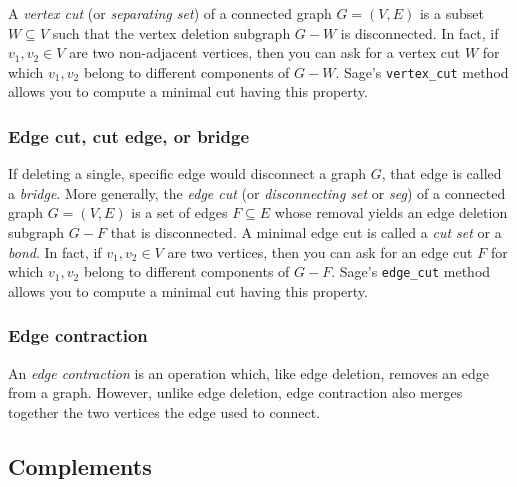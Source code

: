A \emph{vertex cut} (or \emph{separating set}) of a connected graph
$G = (V, E)$ is a subset $W \subseteq V$ such that the vertex deletion
subgraph $G - W$ is disconnected.
In fact, if $v_1, v_2 \in V$ are two non-adjacent vertices, then you
can ask for a vertex cut $W$ for which $v_1, v_2$ belong to different
components of $G - W$. Sage's \verb!vertex_cut! method allows you to
compute a minimal cut having this property.


\subsubsection{Edge cut, cut edge, or bridge}

If deleting a single, specific edge would disconnect a graph $G$, that
edge is called a \emph{bridge}. More generally, the \emph{edge cut}
(or \emph{disconnecting set} or \emph{seg}) of a connected graph
$G = (V, E)$ is a set of edges $F \subseteq E$ whose removal yields an
edge deletion subgraph $G - F$ that is disconnected. A minimal edge
cut is called a \emph{cut set} or a \emph{bond}.
In fact, if $v_1, v_2 \in V$ are two vertices, then you can ask for an
edge cut $F$ for which $v_1, v_2$ belong to different components of
$G - F$. Sage's \verb!edge_cut! method allows you to compute a minimal
cut having this property.


\subsubsection{Edge contraction}

An \emph{edge contraction} is an operation which, like edge deletion,
removes an edge from a graph. However, unlike edge deletion, edge
contraction also merges together the two vertices the edge used to
connect.



\subsection{Complements}


